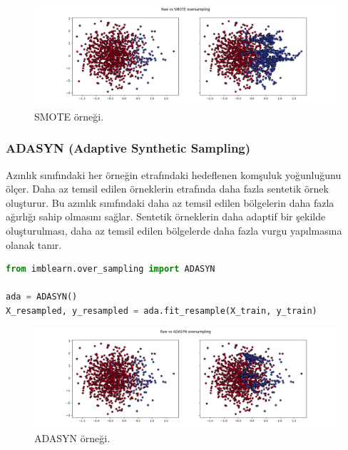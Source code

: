 \begin{figure}[h]
    \centering
    \includegraphics[width=1\textwidth]{images/Raw vs SMOTE oversampling.png}
    \caption{SMOTE örneği.}
    \label{fig:enter-label}
\end{figure}

\newpage

\subsubsection{ADASYN (Adaptive Synthetic Sampling)}
Azınlık sınıfındaki her örneğin etrafındaki hedeflenen komşuluk yoğunluğunu ölçer. Daha az temsil edilen örneklerin etrafında daha fazla sentetik örnek oluşturur. Bu azınlık sınıfındaki daha az temsil edilen bölgelerin daha fazla ağırlığı sahip olmasını sağlar. Sentetik örneklerin daha adaptif bir şekilde oluşturulması, daha az temsil edilen bölgelerde daha fazla vurgu yapılmasına olanak tanır.

\begin{lstlisting}[language=Python]
from imblearn.over_sampling import ADASYN

ada = ADASYN()
X_resampled, y_resampled = ada.fit_resample(X_train, y_train)
\end{lstlisting}

\begin{figure}[h]
    \centering
    \includegraphics[width=1\textwidth]{images/Raw vs ADASYN oversampling.png}
    \caption{ADASYN örneği.}
    \label{fig:enter-label}
\end{figure}

\newpage

